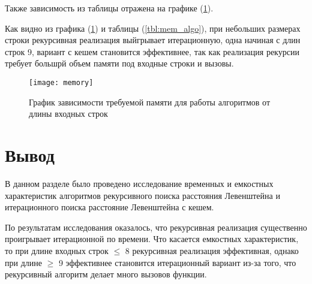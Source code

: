 Также зависимость из таблицы отражена на графике (\ref{fig:mem_graph}).

Как видно из графика (\ref{fig:mem_graph}) и таблицы (\ref{tbl:mem_algo}), при небольших размерах строки рекурсивная реализация выйгрывает итерационную, одна начиная с длин строк 9, вариант с кешем становится эффективнее, так как реализация рекурсии требует большрй объем памяти под входные строки и вызовы.
\begin{figure}
	\centering
	\texttt{[image: memory]}
	\caption{График зависимости требуемой памяти для работы алгоритмов от длины входных строк}
	\label{fig:mem_graph}
\end{figure}

\pagebreak

\section{Вывод}

В данном разделе было проведено исследование временных и емкостных характеристик алгоритмов рекурсивного поиска расстояния Левенштейна и итерационного поиска расстояние Левенштейна с кешем.

По результатам исследования оказалось, что рекурсивная реализация существенно проигрывает итерационной по времени. Что касается емкостных характеристик, то при длине входных строк $\leq$ 8 рекурсивная реализация эффективная, однако при длине $\geq$ 9 эффективнее становится итерационный вариант из-за того, что рекурсивный алгоритм делает много вызовов функции.

\clearpage
